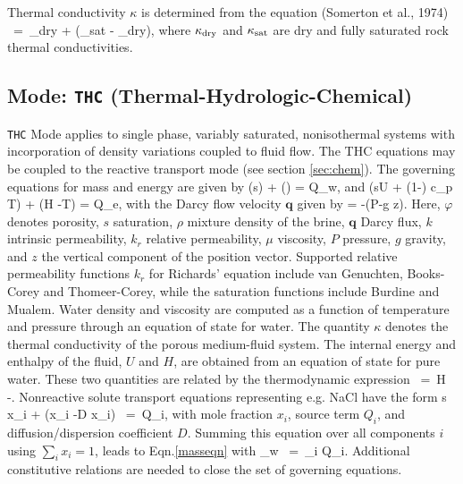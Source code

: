 \documentclass[12pt]{article}
\def\EQ#1\EN{\begin{equation}#1\end{equation}}
\newcommand{\eq}{\ =\ }
\newcommand{\p}{{\partial}}
\newcommand{\bnabla}{\boldsymbol{\nabla}}
\newcommand{\bq}{\boldsymbol{q}}
\begin{document}
 
Thermal conductivity $\kappa$ is determined from the equation (Somerton et 
al., 1974)  
\EQ\label{cond} 
\kappa \eq \kappa_{\rm dry} +  (\kappa_{\rm sat} - \kappa_{\rm dry}), 
\EN 
where $\kappa_{\rm dry}$ and $\kappa_{\rm sat}$ are dry and fully saturated rock thermal conductivities. 


\subsection{Mode: {\tt THC} (Thermal-Hydrologic-Chemical)}

{\tt THC} Mode applies to single phase, variably saturated, nonisothermal systems
with incorporation of density variations coupled to fluid flow. The THC equations may be coupled to the reactive transport mode (see section \ref{sec:chem}).
The governing equations for mass and energy are given by
\EQ\label{masseqn}
\frac{\p}{\p t}\left(\varphi s\rho\right) + \bnabla\cdot\left(\rho\bq\right) = Q_w,
\EN
and
\EQ
\frac{\p}{\p t}\left(\varphi s\rho U + (1-\varphi) c_p T\right) + \bnabla\cdot\left(\rho\bq H -\kappa \bnabla T\right) = Q_e,
\EN
with the Darcy flow velocity $\bq$ given by
\EQ
\bq = -\bnabla\left(P-\rho g z\right).
\EN
Here, $\varphi$ denotes porosity, $s$ saturation, $\rho$ mixture density of the brine, $\bq$ Darcy flux, $k$ intrinsic permeability, $k_r$ relative permeability, $\mu$ viscosity, $P$ pressure, $g$ gravity, and $z$ the vertical component of the position vector.  Supported relative permeability functions $k_r$ for Richards' equation include van Genuchten, Books-Corey and Thomeer-Corey, while the saturation functions include Burdine and Mualem.  Water density and viscosity are computed as a function of temperature and pressure through an equation of state for water. The quantity $\kappa$ denotes the thermal conductivity of the porous medium-fluid system. The internal energy and enthalpy of the fluid, $U$ and $H$, are obtained from an equation of state for pure water. These two quantities are related by the thermodynamic expression
\EQ
U \eq H -.
\EN
Nonreactive solute transport equations representing e.g. NaCl have the form
\EQ
\frac{\p}{\p t} \varphi s \rho x_i + \bnabla\cdot\Big(\bq \rho x_i -\varphi D \rho\bnabla x_i\Big) \eq Q_i,
\EN
with mole fraction $x_i$, source term $Q_i$, and diffusion/dispersion coefficient $D$. Summing this equation over all components $i$ using $\sum_ix_i=1$, leads to Eqn.\eqref{masseqn} with
\EQ
Q_w \eq \sum_i Q_i.
\EN
Additional constitutive relations are needed to close the set of governing equations.
 
\end{document}
